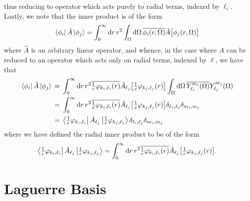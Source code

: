 \documentclass[]{article}
\begin{document}
thus reducing to operator which acts purely to radial terms, indexed by
$\ell_{i}$.
Lastly, we note that the inner product is of the form
\begin{equation*}
  \bra{\phi_{i}}
  \hat{A}
  \ket{\phi_{j}}
  =
  \int_{0}^{\infty}
  \dd{r}
  {
    r^{2}
    \int_{\Omega}
    \dd{\Omega}
    {
      \overline
      {
        \phi_{i}\lr{r, \Omega}
      }
      \hat{A}
      \lrsq[\big]
      {
        \phi_{j}\lr{r, \Omega}
      }
    }
  }
\end{equation*}
where $\hat{A}$ is an arbitrary linear operator, and whence, in the case where
$\hat{A}$ can be reduced to an operator which acts only on radial terms, indexed
by $\ell$, we have that
\begin{alignat*}{2}
  \bra{\phi_{i}}
  \hat{A}
  \ket{\phi_{j}}
  {}={}
  &
  \int_{0}^{\infty}
  \dd{r}
  {
    r^{2}
    \overline
    {
      \tfrac{1}{r}
      \varphi_{k_{i}, \ell_{i}}\lr{r}
    }
    \hat{A}_{\ell_{j}}
    \lrsq[\big]
    {
      \tfrac{1}{r}
      \varphi_{k_{j}, \ell_{j}}\lr{r}
    }
  }
  \int_{\Omega}
  \dd{\Omega}
  {
    \overline
    {
      Y_{\ell_{i}}^{m_{i}}\lr{\Omega}
    }
    Y_{\ell_{j}}^{m_{j}}\lr{\Omega}
  }
  \\
  {}={}
  &
  \int_{0}^{\infty}
  \dd{r}
  {
    r^{2}
    \overline
    {
      \tfrac{1}{r}
      \varphi_{k_{i}, \ell_{i}}\lr{r}
    }
    \hat{A}_{\ell_{j}}
    \lrsq[\big]
    {
      \tfrac{1}{r}
      \varphi_{k_{j}, \ell_{j}}\lr{r}
    }
  }
  \delta_{\ell_{i}, \ell_{j}}
  \delta_{m_{i}, m_{j}}
  \\
  {}={}
  &
  \bra{\tfrac{1}{r}\varphi_{k_{i}, \ell_{i}}}
  \hat{A}_{\ell_{j}}
  \ket{\tfrac{1}{r}\varphi_{k_{j}, \ell_{j}}}
  \delta_{\ell_{i}, \ell_{j}}
  \delta_{m_{i}, m_{j}}
\end{alignat*}
where we have defined the radial inner product to be of the form
\begin{equation*}
  \bra{\tfrac{1}{r}\varphi_{k_{i}, \ell_{i}}}
  \hat{A}_{\ell_{j}}
  \ket{\tfrac{1}{r}\varphi_{k_{j}, \ell_{j}}}
  =
  \int_{0}^{\infty}
  \dd{r}
  {
    r^{2}
    \overline
    {
      \tfrac{1}{r}
      \varphi_{k_{i}, \ell_{i}}\lr{r}
    }
    \hat{A}_{\ell_{j}}
    \lrsq[\big]
    {
      \tfrac{1}{r}
      \varphi_{k_{j}, \ell_{j}}\lr{r}
    }
  }
  .
\end{equation*}

\clearpage
\section{Laguerre Basis}
\label{sec:laguerre-basis}
\end{document}
